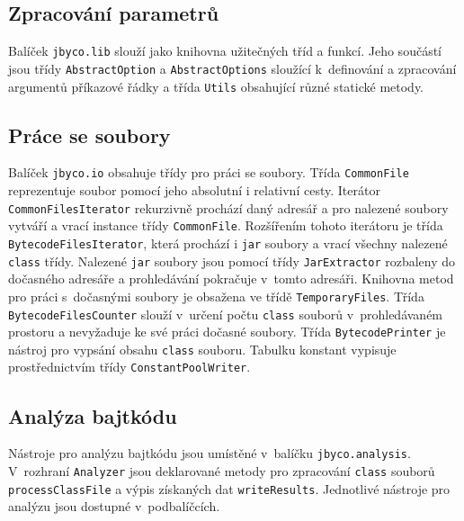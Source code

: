 \subsection{Zpracování parametrů}

Balíček \texttt{jbyco.lib} slouží jako knihovna užitečných tříd a funkcí. Jeho součástí jsou třídy \texttt{AbstractOption} a \texttt{AbstractOptions} sloužící k~definování a zpracování argumentů příkazové řádky a třída \texttt{Utils} obsahující různé statické metody. 

\subsection{Práce se soubory}

Balíček \texttt{jbyco.io} obsahuje třídy pro práci se soubory. Třída \texttt{CommonFile} reprezentuje soubor pomocí jeho absolutní i relativní cesty. Iterátor \texttt{CommonFilesIterator} rekurzivně prochází daný adresář a pro nalezené soubory vytváří a vrací instance třídy \texttt{CommonFile}. Rozšířením tohoto iterátoru je třída \texttt{BytecodeFilesIterator}, která prochází i \texttt{jar} soubory a vrací všechny nalezené \texttt{class} třídy. Nalezené \texttt{jar} soubory jsou pomocí třídy \texttt{JarExtractor} rozbaleny do dočasného adresáře a prohledávání pokračuje v~tomto adresáři. Knihovna metod pro práci s~dočasnými soubory je obsažena ve třídě \texttt{TemporaryFiles}. Třída \texttt{BytecodeFilesCounter} slouží v~určení počtu \texttt{class} souborů v~prohledávaném prostoru a nevyžaduje ke své práci dočasné soubory. 
Třída \texttt{BytecodePrinter} je nástroj pro vypsání obsahu \texttt{class} souboru. Tabulku konstant vypisuje prostřednictvím třídy \texttt{ConstantPoolWriter}.  

\subsection{Analýza bajtkódu}

Nástroje pro analýzu bajtkódu jsou umístěné v~balíčku \texttt{jbyco.analysis}. V~rozhraní \texttt{Analyzer} jsou deklarované metody pro zpracování \texttt{class} souborů \texttt{processClassFile} a výpis získaných dat \texttt{writeResults}. Jednotlivé nástroje pro analýzu jsou dostupné v~podbalíčcích.

